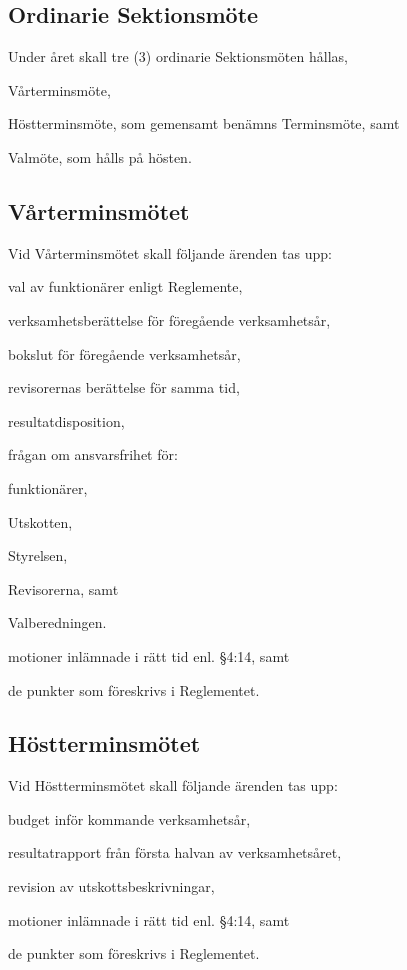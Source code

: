 \documentclass[10pt]{article}
\begin{document}
    \subsection{Ordinarie Sektionsmöte}
    Under året skall tre (3) ordinarie Sektionsmöten hållas,
    \begin{alphlist}
    \item 	Vårterminsmöte,
    \item 	Höstterminsmöte, som gemensamt benämns Terminsmöte, samt
    \item 	Valmöte, som hålls på hösten.
    \end{alphlist}
    
    \subsection{Vårterminsmötet}
    Vid Vårterminsmötet skall följande ärenden tas upp:
    \begin{alphlist}
    \item 	val av funktionärer enligt Reglemente,
    \item 	verksamhetsberättelse för föregående verksamhetsår,
    \item 	bokslut för föregående verksamhetsår,
    \item 	revisorernas berättelse för samma tid,
    \item 	resultatdisposition,
    \item 	frågan om ansvarsfrihet för:
        \begin{numplist}
            \item  	funktionärer,
            \item 	Utskotten,
            \item 	Styrelsen,
            \item 	Revisorerna, samt
            \item 	Valberedningen.
        \end{numplist}
    \item 	motioner inlämnade i rätt tid enl. §4:14, samt
    \item 	de punkter som föreskrivs i Reglementet.
    \end{alphlist}
    
    \subsection{Höstterminsmötet}
    Vid Höstterminsmötet skall följande ärenden tas upp:
    \begin{alphlist}
    \item 	budget inför kommande verksamhetsår,
    \item 	resultatrapport från första halvan av verksamhetsåret,
    \item 	revision av utskottsbeskrivningar,
    \item 	motioner inlämnade i rätt tid enl. §4:14, samt
    \item 	de punkter som föreskrivs i Reglementet.
    \end{alphlist}
    
\end{document}
